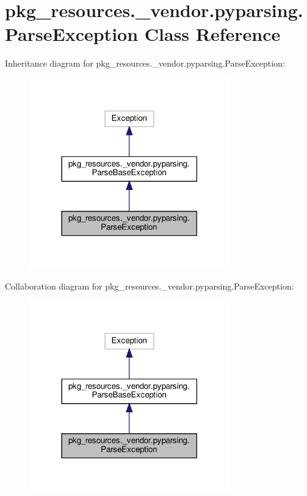 \hypertarget{classpkg__resources_1_1__vendor_1_1pyparsing_1_1ParseException}{}\section{pkg\+\_\+resources.\+\_\+vendor.\+pyparsing.\+Parse\+Exception Class Reference}
\label{classpkg__resources_1_1__vendor_1_1pyparsing_1_1ParseException}


Inheritance diagram for pkg\+\_\+resources.\+\_\+vendor.\+pyparsing.\+Parse\+Exception\+:
\nopagebreak
\begin{figure}[H]
\begin{center}
\leavevmode
\includegraphics[width=246pt]{classpkg__resources_1_1__vendor_1_1pyparsing_1_1ParseException__inherit__graph}
\end{center}
\end{figure}


Collaboration diagram for pkg\+\_\+resources.\+\_\+vendor.\+pyparsing.\+Parse\+Exception\+:
\nopagebreak
\begin{figure}[H]
\begin{center}
\leavevmode
\includegraphics[width=246pt]{classpkg__resources_1_1__vendor_1_1pyparsing_1_1ParseException__coll__graph}
\end{center}
\end{figure}
